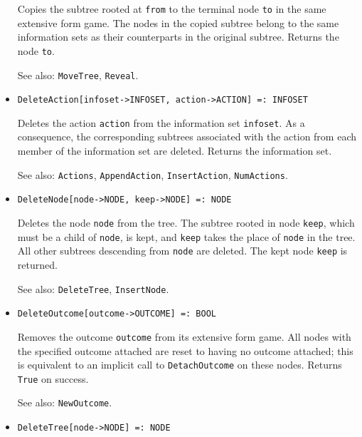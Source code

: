 \begin{itemize}
\bd
Copies the subtree rooted at \verb+from+ to the terminal
node \verb+to+ in the same extensive form game.  The nodes in the
copied subtree belong to the same information sets as their counterparts in
the original subtree.  Returns the node \verb+to+.
\item
[See also:] {\tt MoveTree}, {\tt Reveal}.
\ed


\item
\protect \large \begin{verbatim}
DeleteAction[infoset->INFOSET, action->ACTION] =: INFOSET
\end{verbatim}\normalsize

\bd
Deletes the action \verb+action+ from the information set
\verb+infoset+.  As a consequence, the corresponding subtrees associated
with the action from each member of the information set are deleted.
Returns the information set.
\item
[See also:] {\tt Actions}, {\tt AppendAction}, {\tt InsertAction},
{\tt NumActions}.
\ed

\item
\protect \large \begin{verbatim}
DeleteNode[node->NODE, keep->NODE] =: NODE
\end{verbatim}\normalsize

\bd
Deletes the node \verb+node+ from the tree.  The
subtree rooted in node \verb+keep+, which must be a child of
\verb+node+, is kept, and \verb+keep+ takes the place of \verb+node+ in
the tree.  All other subtrees descending from \verb+node+ are deleted.
The kept node \verb+keep+ is returned.
\item
[See also:] {\tt DeleteTree}, {\tt InsertNode}.
\ed

\item
\protect \large \begin{verbatim}
DeleteOutcome[outcome->OUTCOME] =: BOOL
\end{verbatim}\normalsize

\bd
Removes the outcome \verb+outcome+ from its extensive
form game.  All nodes with the specified outcome attached are reset to
having no outcome attached; this is equivalent to an implicit call to
{\tt DetachOutcome} on these nodes.  Returns \verb+True+ on success.
\item
[See also:] {\tt NewOutcome}.
\ed

\item
\protect \large \begin{verbatim}
DeleteTree[node->NODE] =: NODE
\end{verbatim}\normalsize


\end{itemize}
